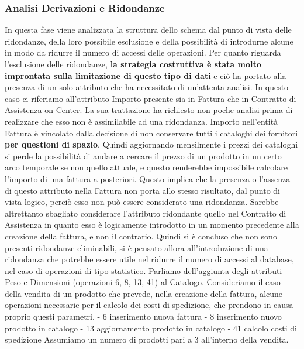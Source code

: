 
\subsubsection{Analisi Derivazioni e Ridondanze}
In questa fase viene analizzata la struttura dello schema dal punto di vista delle ridondanze, della loro possibile esclusione e della possibilità di introdurne alcune in modo da ridurre il numero di accessi delle operazioni. \newline
Per quanto riguarda l'esclusione delle ridondanze, \textbf{la strategia costruttiva è stata molto improntata sulla limitazione di questo tipo di dati} e ciò ha portato alla presenza di un solo attributo che ha necessitato di un'attenta analisi. In questo caso ci riferiamo all'attributo Importo presente sia in Fattura che in Contratto di Assistenza on Center. La sua trattazione ha richiesto non poche analisi prima di realizzare che esso non è assimilabile ad una ridondanza. Importo nell'entità Fattura è vincolato dalla decisione di non conservare tutti i cataloghi dei fornitori \textbf{per questioni di spazio}. Quindi aggiornando mensilmente i prezzi dei cataloghi si perde la possibilità di andare a cercare il prezzo di un prodotto in un certo arco temporale se non quello attuale, e questo renderebbe impossibile calcolare l'importo di una fattura a posteriori.\newline
Questo implica che la presenza o l'assenza di questo attributo nella Fattura non porta allo stesso risultato, dal punto di vista logico, perciò esso non può essere considerato una ridondanza. Sarebbe altrettanto sbagliato considerare l'attributo ridondante quello nel Contratto di Assistenza in quanto esso è logicamente introdotto in un momento precedente alla creazione della fattura, e non il contrario.\newline\newline
Quindi si è concluso che non sono presenti ridondanze eliminabili, si è pensato allora all'introduzione di una ridondanza che potrebbe essere utile nel ridurre il numero di accessi al database, nel caso di operazioni di tipo statistico. Parliamo dell'aggiunta degli attributi Peso e Dimensioni (operazioni 6, 8, 13, 41) al Catalogo.
Consideriamo il caso della vendita di un prodotto che prevede, nella creazione della fattura, alcune operazioni necessarie per il calcolo dei costi di spedizione, che prendono in causa proprio questi parametri.
\noindent\newline
- 6 inserimento nuova fattura\newline
- 8 inserimento nuovo prodotto in catalogo\newline
- 13 aggiornamento prodotto in catalogo\newline
- 41 calcolo costi di spedizione
\newline\newline
Assumiamo un numero di prodotti pari a 3 all'interno della vendita.
\vspace{1cm}

